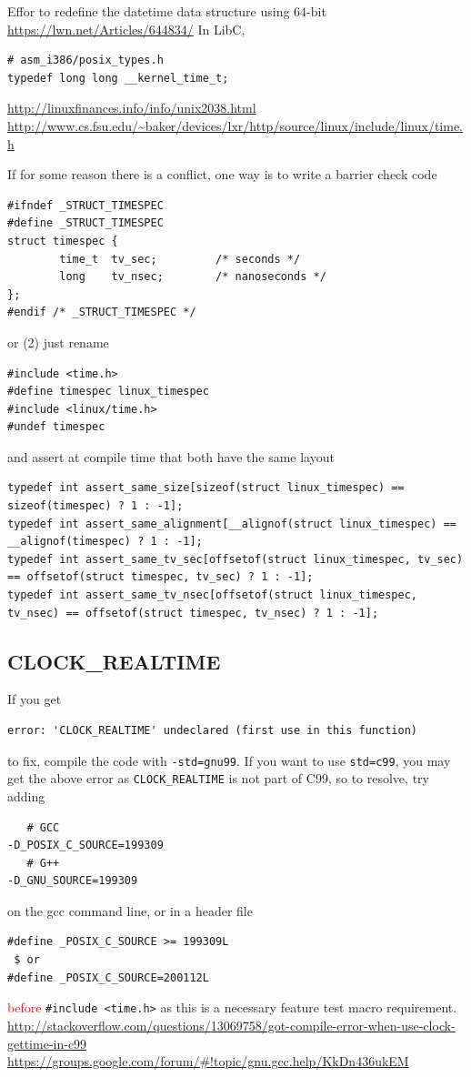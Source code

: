 Effor to redefine the datetime data structure using 64-bit
\url{https://lwn.net/Articles/644834/}
In LibC, 
\begin{verbatim}
# asm_i386/posix_types.h
typedef long long __kernel_time_t;
\end{verbatim}
\url{http://linuxfinances.info/info/unix2038.html}
\url{http://www.cs.fsu.edu/~baker/devices/lxr/http/source/linux/include/linux/time.h}


If for some reason there is a conflict, one way is to write a barrier check code 
\begin{verbatim}
#ifndef _STRUCT_TIMESPEC
#define _STRUCT_TIMESPEC
struct timespec {
        time_t  tv_sec;         /* seconds */
        long    tv_nsec;        /* nanoseconds */
};
#endif /* _STRUCT_TIMESPEC */
\end{verbatim}
or (2) just rename
\begin{verbatim}
#include <time.h>
#define timespec linux_timespec
#include <linux/time.h>
#undef timespec
\end{verbatim}
and assert at compile time that both have the same layout
\begin{verbatim}
typedef int assert_same_size[sizeof(struct linux_timespec) == sizeof(timespec) ? 1 : -1];
typedef int assert_same_alignment[__alignof(struct linux_timespec) == __alignof(timespec) ? 1 : -1];
typedef int assert_same_tv_sec[offsetof(struct linux_timespec, tv_sec) == offsetof(struct timespec, tv_sec) ? 1 : -1];
typedef int assert_same_tv_nsec[offsetof(struct linux_timespec, tv_nsec) == offsetof(struct timespec, tv_nsec) ? 1 : -1];
\end{verbatim}

\subsection{CLOCK\_REALTIME}


If you get 
\begin{verbatim}
error: 'CLOCK_REALTIME' undeclared (first use in this function)
\end{verbatim}
to fix, compile the code with \verb!-std=gnu99!. If you want to use
\verb!std=c99!, you may get the above error as \verb!CLOCK_REALTIME! is not part
of C99, so to resolve, try adding
\begin{verbatim}
   # GCC
-D_POSIX_C_SOURCE=199309
   # G++
-D_GNU_SOURCE=199309   
\end{verbatim} 
on the gcc command line, or in a header file 
\begin{verbatim}
#define _POSIX_C_SOURCE >= 199309L
 $ or
#define _POSIX_C_SOURCE=200112L 
\end{verbatim}
\textcolor{red}{before}
\verb!#include <time.h>! as this is a necessary feature test macro requirement.
\url{http://stackoverflow.com/questions/13069758/got-compile-error-when-use-clock-gettime-in-c99}
\url{https://groups.google.com/forum/#!topic/gnu.gcc.help/KkDn436ukEM}


